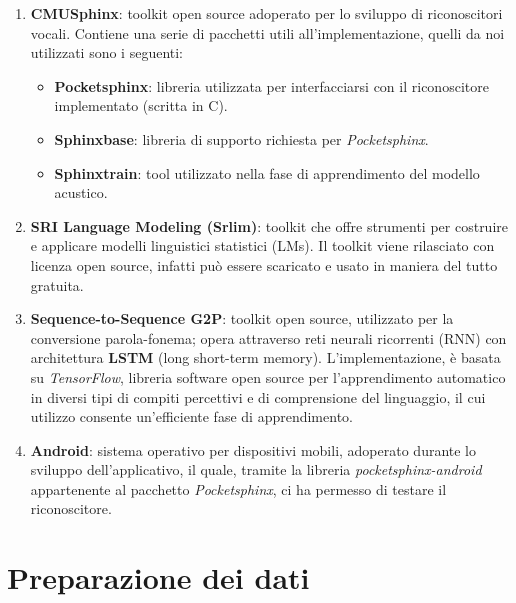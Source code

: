 \documentclass[12pt]{article}
\begin{document}
    \begin{enumerate}
        \item \textbf{CMUSphinx}: toolkit open source adoperato per lo sviluppo di riconoscitori vocali. Contiene una serie di pacchetti utili all'implementazione, quelli da noi utilizzati sono i seguenti:
         \begin{itemize}         
            \item \textbf{Pocketsphinx}: libreria utilizzata per interfacciarsi con il riconoscitore implementato (scritta in C).
            \item \textbf{Sphinxbase}: libreria di supporto richiesta per \textit{Pocketsphinx}. 
            \item \textbf{Sphinxtrain}: tool utilizzato nella fase di apprendimento del modello acustico.
        \end{itemize}
        
        \item \textbf{SRI Language Modeling (Srlim)}: toolkit che offre strumenti per costruire e applicare modelli linguistici statistici (LMs). Il toolkit viene rilasciato con licenza open source, infatti può essere scaricato e usato in maniera del tutto gratuita.
        
        \item \textbf{Sequence-to-Sequence G2P}: toolkit open source, utilizzato per la conversione parola-fonema; opera attraverso reti neurali ricorrenti (RNN) con architettura \textbf{LSTM} (long short-term memory). L'implementazione, è basata su \textit{TensorFlow}, libreria software open source per l'apprendimento automatico in diversi tipi di compiti percettivi e di comprensione del linguaggio, il cui utilizzo consente un'efficiente fase di apprendimento.
        
        \item \textbf{Android}: sistema operativo per dispositivi mobili, adoperato durante lo sviluppo dell'applicativo, il quale, tramite la libreria \textit{pocketsphinx-android} appartenente al pacchetto \textit{Pocketsphinx}, ci ha permesso di testare il riconoscitore.
    
    \end{enumerate}
  
\newpage
\section{Preparazione dei dati}
\end{document}
